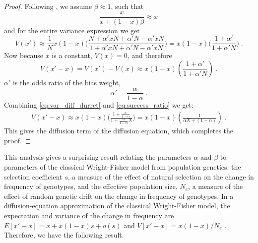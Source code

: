 \documentclass[12pt]{extarticle}
\begin{document}
\begin{proof}
Following \citet[ch~7.2]{durret}, we assume $\beta \approx 1$, such that
\begin{equation}
\frac{x}{x + (1-x)\beta} \approx x \,
\end{equation}
and for the entire variance expression we get
\begin{equation}
V(x') \approx  \frac{1}{N} x(1-x)
\Big(\frac{N + \alpha' xN + \alpha' N - \alpha' xN}{1 + \alpha' xN + \alpha' N - \alpha' xN}\Big)
= x(1-x)\Big(\frac{1 + \alpha'}{1 + \alpha' N}\Big) \;.
\end{equation}
Now because $x$ is a constant, $V(x) = 0$, and therefore
\begin{equation}\label{eq:var_diff_durret}
V(x'-x) = V(x') - V(x) \approx  x(1-x)(\frac{1 + \alpha'}{1 + \alpha' N}) \;.
\end{equation}
$\alpha'$ is the odds ratio of the bias weight, 
\begin{equation}\label{eq:success_ratio}
\alpha' = \frac{\alpha}{1-\alpha} \;.
\end{equation}
Combining \cref{eq:var_diff_durret} and \cref{eq:success_ratio} we get:
\begin{equation}\label{eq:const_var}
\begin{split}
V(x'-x) \approx x(1-x)\Big(\frac{1 + \frac{\alpha}{1-\alpha}}{1 + \frac{\alpha}{1-\alpha} N}\Big)
  = x(1-x)(\frac{1}{\alpha N + (1-\alpha)}) \;.
\end{split}
\end{equation}
This gives the diffusion term of the diffusion equation, which completes the proof.
\end{proof}


This analysis gives a surprising result relating the parameters $\alpha$ and $\beta$ to parameters of the classical Wright-Fisher model from population genetics:
the selection coefficient $s$, a measure of the effect of natural selection on the change in frequency of genotypes, and the effective population size, $N_e$, a measure of the effect of random genetic drift on the change in frequency of genotypes. 
In a diffusion-equation approximation of the classical Wright-Fisher model, the expectation and variance of the change in frequency are $E[x'-x]=x+x(1-x)s+o(s)$ and $V[x'-x]=x(1-x)/N_e$ \citep[eq.~7]{kimura}. 
Therefore, we have the following result.\\
\end{document}

